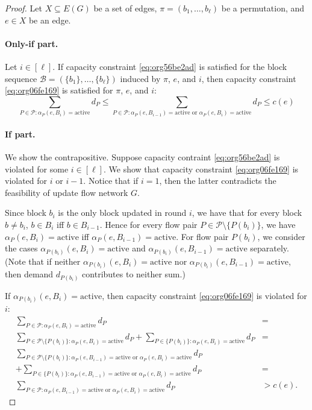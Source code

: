 \documentclass[fontsize=11pt,paper=a4]{book}
\begin{document}
\begin{proof}
Let \(X\subseteq E(G)\) be a set of edges, \(\pi=(b_1,\dots,b_{\ell})\) be a permutation, and \(e\in X\) be an edge.

\paragraph{Only-if part.}
Let \(i\in[\ell]\).
If capacity constraint \ref{eq:org56be2ad} is satisfied for the block sequence \(\mathcal{B}=(\{b_1\},\dots,\{b_{\ell}\})\) induced by \(\pi\), \(e\), and \(i\), then capacity constraint \ref{eq:org06fe169} is satisfied for \(\pi\), \(e\), and \(i\):
\[
\sum_{P\in\mathcal{P}:\alpha_P(e,B_i)=\mathrm{active}}d_P\leq\sum_{P\in\mathcal{P}:\alpha_P(e,B_{i-1})=\mathrm{active}\text{ or }\alpha_P(e,B_i)=\mathrm{active}}d_P\leq c(e)
\]

\paragraph{If part.}
We show the contrapositive.
Suppose capacity contraint \ref{eq:org56be2ad} is violated for some \(i\in[\ell]\).
We show that capacity constraint \ref{eq:org06fe169} is violated for \(i\) or \(i-1\).
Notice that if \(i=1\), then the latter contradicts the feasibility of update flow network \(G\).

Since block \(b_i\) is the only block updated in round \(i\), we have that for every block \(b\neq b_i\), \(b\in B_i\) iff \(b\in B_{i-1}\).
Hence for every flow pair \(P\in\mathcal{P}\setminus\{P(b_i)\}\), we have \(\alpha_P(e,B_i)=\mathrm{active}\) iff \(\alpha_P(e,B_{i-1})=\mathrm{active}\).
For flow pair \(P(b_i)\), we consider the cases \(\alpha_{P(b_i)}(e,B_i)=\mathrm{active}\) and \(\alpha_{P(b_i)}(e,B_{i-1})=\mathrm{active}\) separately.
(Note that if neither \(\alpha_{P(b_i)}(e,B_i)=\mathrm{active}\) nor \(\alpha_{P(b_i)}(e,B_{i-1})=\mathrm{active}\), then demand \(d_{P(b_i)}\) contributes to neither sum.)

If \(\alpha_{P(b_i)}(e,B_i)=\mathrm{active}\), then capacity constraint \ref{eq:org06fe169} is violated for \(i\):
\begin{align*}
\sum_{P\in\mathcal{P}:\alpha_P(e,B_i)=\mathrm{active}}d_P&=\\
\sum_{P\in\mathcal{P}\setminus\{P(b_i)\}:\alpha_P(e,B_i)=\mathrm{active}}d_P+\sum_{P\in\{P(b_i)\}:\alpha_P(e,B_i)=\mathrm{active}}d_P&=\\
\sum_{P\in\mathcal{P}\setminus\{P(b_i)\}:\alpha_P(e,B_{i-1})=\mathrm{active}\text{ or }\alpha_P(e,B_i)=\mathrm{active}}d_P&\\
+\sum_{P\in\{P(b_i)\}:\alpha_P(e,B_{i-1})=\mathrm{active}\text{ or }\alpha_P(e,B_i)=\mathrm{active}}d_P&=\\
\sum_{P\in\mathcal{P}:\alpha_P(e,B_{i-1})=\mathrm{active}\text{ or }\alpha_P(e,B_i)=\mathrm{active}}d_P&>
c(e).
\end{align*}


\end{proof}
\end{document}
